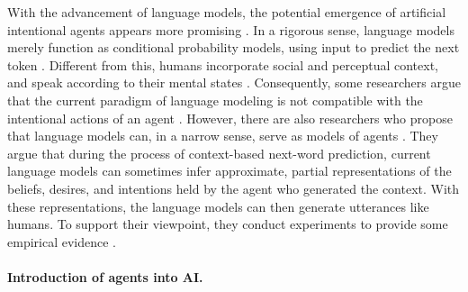\documentclass{article}
\begin{document}
With the advancement of language models, the potential emergence of artificial intentional agents appears more promising \cite{DBLP:conf/nips/Ouyang0JAWMZASR22,DBLP:journals/corr/abs-2303-08774,radford2018improving,radford2019language,DBLP:conf/nips/BrownMRSKDNSSAA20}. 
In a rigorous sense, language models merely function as conditional probability models, using input to predict the next token \cite{DBLP:conf/naacl/LinJLGE21}. Different from this, humans incorporate social and perceptual context, and speak according to their mental states \cite{tomasello2005constructing,bloom2002children}. 
Consequently, some researchers argue that the current paradigm of language modeling is not compatible with the intentional actions of an agent \cite{DBLP:conf/emnlp/BiskHTABCLLMNPT20,zwaan2005embodied}. 
However, there are also researchers who propose that language models can, in a narrow sense, serve as models of agents \cite{DBLP:conf/emnlp/Andreas22,DBLP:journals/corr/abs-2306-12672}. They argue that during the process of context-based next-word prediction, current language models can sometimes infer approximate, partial representations of the beliefs, desires, and intentions held by the agent who generated the context. With these representations, the language models can then generate utterances like humans. To support their viewpoint, they conduct experiments to provide some empirical evidence \cite{DBLP:conf/emnlp/Andreas22,DBLP:journals/corr/RadfordJS17,DBLP:conf/acl/LiNA20}.

\paragraph{Introduction of agents into AI.}
\end{document}
